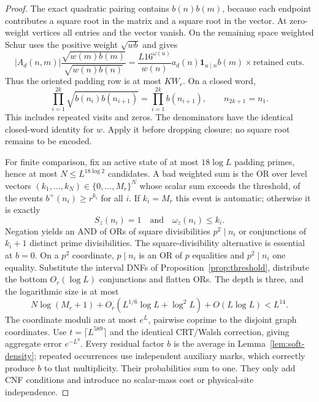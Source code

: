 \documentclass[11pt]{article}
\theoremstyle{definition}
\newcommand{\ind}{\mathbf 1}
\theoremstyle{remark}
\numberwithin{equation}{section}
\begin{document}
\begin{proof}
The exact quadratic pairing contains $b(n)b(m)$, because each endpoint contributes a square root in the matrix
and a square root in the vector. At zero-weight vertices all entries and the vector vanish.
On the remaining space weighted Schur uses the positive weight $\sqrt{wb}$ and gives
\begin{equation}\label{eq:soft-balancing}
 |A_d(n,m)|\frac{\sqrt{w(m)b(m)}}{\sqrt{w(n)b(n)}}
 =\frac{L16^{\omega(u)}}{w(n)}a_d(n)\ind_{u\mid n}b(m)\times\text{retained cuts}.
\end{equation}
Thus the oriented padding row is at most $KW_r$.
On a closed word,
\begin{equation}\label{eq:soft-arrival}
 \prod_{i=1}^{2k}\sqrt{b(n_i)b(n_{i+1})}=\prod_{i=1}^{2k}b(n_{i+1}),\qquad n_{2k+1}=n_1.
\end{equation}
This includes repeated visits and zeros. The denominators have the identical closed-word identity for $w$.
Apply it before dropping closure; no square root remains to be encoded.

For finite comparison, fix an active state of at most $18\log L$ padding primes, hence at most
$N\le L^{18\log2}$ candidates. A bad weighted sum is the OR over level vectors
$(k_1,\ldots,k_N)\in\{0,\ldots,M_r\}^N$ whose scalar sum exceeds the threshold, of the events
$b^+(n_i)\ge r^{k_i}$ for all $i$. If $k_i=M_r$ this event is automatic; otherwise it is exactly
\begin{equation}\label{eq:cap-level}
 S_z(n_i)=1\quad\text{and}\quad\omega_z(n_i)\le k_i.
\end{equation}
Negation yields an AND of ORs of square divisibilities $p^2\mid n_i$ or conjunctions of $k_i+1$ distinct prime
divisibilities. The square-divisibility alternative is essential at $b=0$.
On a $p^2$ coordinate, $p\mid n_i$ is an OR of $p$ equalities and $p^2\mid n_i$ one equality.
Substitute the interval DNFs of Proposition~\ref{prop:threshold}, distribute the bottom $O_r(\log L)$
conjunctions and flatten ORs. The depth is three, and the logarithmic size is at most
\begin{equation}\label{eq:soft-circuit-size}
 N\log(M_r+1)+O_r(L^{1/6}\log L+\log^2L)+O(L\log L)<L^{14}.
\end{equation}
The coordinate moduli are at most $e^L$, pairwise coprime to the disjoint graph coordinates.
Use $t=\lceil L^{589}\rceil$ and the identical CRT/Walsh correction, giving aggregate error $e^{-L^9}$.
Every residual factor $b$ is the average in Lemma~\ref{lem:soft-density}; repeated occurrences use independent
auxiliary marks, which correctly produce $b$ to that multiplicity. Their probabilities sum to one.
They only add CNF conditions and introduce no scalar-mass cost or physical-site independence.


\end{proof}
\end{document}
